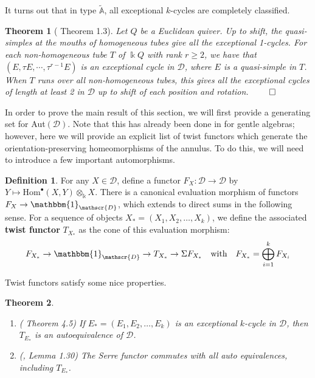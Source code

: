 \documentclass[12pt]{amsart}
\theoremstyle{plain}
\newtheorem{thm}{Theorem}[section]
\theoremstyle{definition}
\newtheorem{defn}{Definition}[section]
\theoremstyle{remark}
\begin{document}
It turns out that in type $\tilde{\mathbb{A}}$, all exceptional $k$-cycles are completely classified.

\begin{thm}[\cite {guo2020exceptional} Theorem 1.3]

Let $Q$ be a Euclidean quiver. {\color{black} Up to shift, the quasi-simples at the mouths of homogeneous tubes give all the exceptional 1-cycles.} For each non-homogeneous tube $T$ of $\Bbbk Q$ with rank $r \geq 2$, we have that $(E, \tau E, \cdots, \tau^{r-1} E)$ is an exceptional cycle in $\mathscr{D}$, where $E$ is a quasi-simple in $T$. When $T$ runs over all non-homogeneous tubes, this gives all the exceptional cycles of length at least 2 in $\mathscr{D}$ up to shift {\color{black} of each position} and rotation. $\hfill \qed$
\end{thm}

In order to prove the main result of this section, we will first provide a generating set for Aut$(\mathscr{D})$. Note that this has already been done in \cite{opper2019auto} for gentle algebras; however, here we will provide an explicit list of twist functors which generate the orientation-preserving homeomorphisms of the annulus. To do this, we will need to introduce a few important automorphisms.

\begin{defn}
For any $X \in \mathscr{D}$, define a functor $F_X: \mathscr{D} \rightarrow \mathscr{D}$ by $Y \mapsto \text{Hom}^{\bullet}(X,Y) \otimes_{\Bbbk} X$. There is a canonical evaluation morphism of functors $F_X \rightarrow \mathbbm{1}_{\mathscr{D}}$, which extends to direct sums in the following sense. For a sequence of objects $X_* = (X_1, X_2, \dots, X_k)$, we define the associated \textbf{twist functor} $T_{X_*}$ as the cone of this evaluation morphism: $$F_{X_*} \rightarrow \mathbbm{1}_{\mathscr{D}} \rightarrow T_{X_*} \rightarrow \Sigma F_{X_*} \,\,\,\,\,\, \text{with} \,\,\,\,\,\, F_{X_*} = \bigoplus_{i=1}^k F_{X_i}$$
\end{defn}

Twist functors satisfy some nice properties.

\begin{thm}
\leavevmode
\begin{enumerate}
\item (\cite{broomhead2017discrete} Theorem 4.5)  If $E_* = (E_1, E_2, \dots, E_k)$ is an exceptional $k$-cycle in $\mathscr{D}$, then $T_{E_*}$ is an autoequivalence of $\mathscr{D}$.

\item (\cite{huybrechts2006fourier}, Lemma 1.30) The Serre functor commutes with all auto equivalences, including $T_{E_*}$.
\end{enumerate}
\end{thm}
\end{document}
